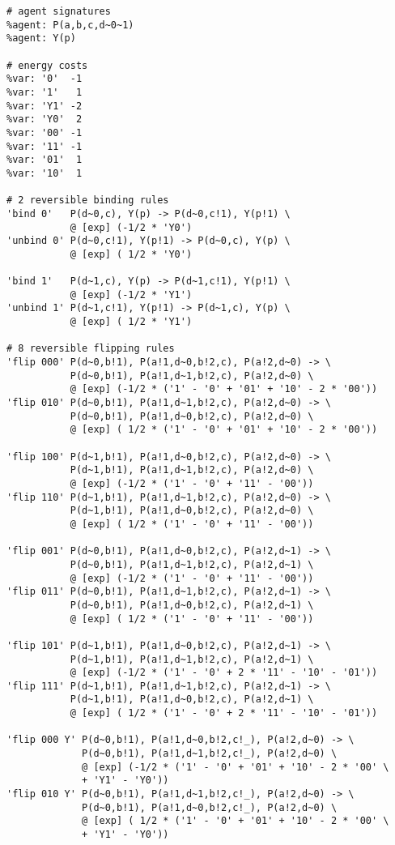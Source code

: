 \begin{lstlisting}[language=kappa]
# agent signatures
%agent: P(a,b,c,d~0~1)
%agent: Y(p)

# energy costs
%var: '0'  -1
%var: '1'   1
%var: 'Y1' -2
%var: 'Y0'  2
%var: '00' -1
%var: '11' -1
%var: '01'  1
%var: '10'  1

# 2 reversible binding rules
'bind 0'   P(d~0,c), Y(p) -> P(d~0,c!1), Y(p!1) \
           @ [exp] (-1/2 * 'Y0')
'unbind 0' P(d~0,c!1), Y(p!1) -> P(d~0,c), Y(p) \
           @ [exp] ( 1/2 * 'Y0')

'bind 1'   P(d~1,c), Y(p) -> P(d~1,c!1), Y(p!1) \
           @ [exp] (-1/2 * 'Y1')
'unbind 1' P(d~1,c!1), Y(p!1) -> P(d~1,c), Y(p) \
           @ [exp] ( 1/2 * 'Y1')

# 8 reversible flipping rules
'flip 000' P(d~0,b!1), P(a!1,d~0,b!2,c), P(a!2,d~0) -> \
           P(d~0,b!1), P(a!1,d~1,b!2,c), P(a!2,d~0) \
           @ [exp] (-1/2 * ('1' - '0' + '01' + '10' - 2 * '00'))
'flip 010' P(d~0,b!1), P(a!1,d~1,b!2,c), P(a!2,d~0) -> \
           P(d~0,b!1), P(a!1,d~0,b!2,c), P(a!2,d~0) \
           @ [exp] ( 1/2 * ('1' - '0' + '01' + '10' - 2 * '00'))

'flip 100' P(d~1,b!1), P(a!1,d~0,b!2,c), P(a!2,d~0) -> \
           P(d~1,b!1), P(a!1,d~1,b!2,c), P(a!2,d~0) \
           @ [exp] (-1/2 * ('1' - '0' + '11' - '00'))
'flip 110' P(d~1,b!1), P(a!1,d~1,b!2,c), P(a!2,d~0) -> \
           P(d~1,b!1), P(a!1,d~0,b!2,c), P(a!2,d~0) \
           @ [exp] ( 1/2 * ('1' - '0' + '11' - '00'))

'flip 001' P(d~0,b!1), P(a!1,d~0,b!2,c), P(a!2,d~1) -> \
           P(d~0,b!1), P(a!1,d~1,b!2,c), P(a!2,d~1) \
           @ [exp] (-1/2 * ('1' - '0' + '11' - '00'))
'flip 011' P(d~0,b!1), P(a!1,d~1,b!2,c), P(a!2,d~1) -> \
           P(d~0,b!1), P(a!1,d~0,b!2,c), P(a!2,d~1) \
           @ [exp] ( 1/2 * ('1' - '0' + '11' - '00'))

'flip 101' P(d~1,b!1), P(a!1,d~0,b!2,c), P(a!2,d~1) -> \
           P(d~1,b!1), P(a!1,d~1,b!2,c), P(a!2,d~1) \
           @ [exp] (-1/2 * ('1' - '0' + 2 * '11' - '10' - '01'))
'flip 111' P(d~1,b!1), P(a!1,d~1,b!2,c), P(a!2,d~1) -> \
           P(d~1,b!1), P(a!1,d~0,b!2,c), P(a!2,d~1) \
           @ [exp] ( 1/2 * ('1' - '0' + 2 * '11' - '10' - '01'))

'flip 000 Y' P(d~0,b!1), P(a!1,d~0,b!2,c!_), P(a!2,d~0) -> \
             P(d~0,b!1), P(a!1,d~1,b!2,c!_), P(a!2,d~0) \
             @ [exp] (-1/2 * ('1' - '0' + '01' + '10' - 2 * '00' \
             + 'Y1' - 'Y0'))
'flip 010 Y' P(d~0,b!1), P(a!1,d~1,b!2,c!_), P(a!2,d~0) -> \
             P(d~0,b!1), P(a!1,d~0,b!2,c!_), P(a!2,d~0) \
             @ [exp] ( 1/2 * ('1' - '0' + '01' + '10' - 2 * '00' \
             + 'Y1' - 'Y0'))


\end{lstlisting}
